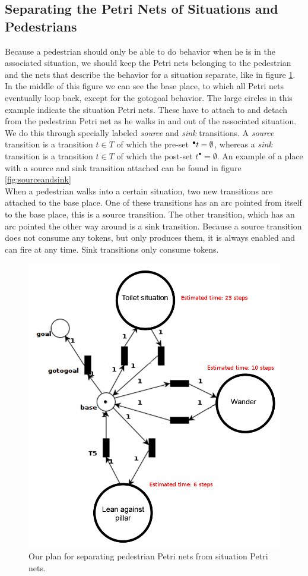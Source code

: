 \documentclass[11pt, a4paper]{book}
\begin{document}
\subsection{Separating the Petri Nets of Situations and Pedestrians}
Because a pedestrian should only be able to do behavior when he is in the associated situation, we should keep the Petri nets belonging to the pedestrian and the nets that describe the behavior for a situation separate, like in figure \ref{petrinetexample}. In the middle of this figure we can see the base place, to which all Petri nets eventually loop back, except for the gotogoal behavior. The large circles in this example indicate the situation Petri nets. These have to attach to and detach from the pedestrian Petri net as he walks in and out of the associated situation. We do this through specially labeled \emph{source} and \emph{sink} transitions.
A \emph{source} transition is a transition $t \in T$ of which the pre-set $\prescript{\bullet}{}{t} = \emptyset$, whereas a \emph{sink} transition is a transition $t \in T$ of which the post-set $t^{\bullet} = \emptyset$. An example of a place with a source and sink transition attached can be found in figure \ref{fig:sourceandsink}\\
 When a pedestrian walks into a certain situation, two new transitions are attached to the base place. One of these transitions has an arc pointed from itself to the base place, this is a source transition. The other transition, which has an arc pointed the other way around is a sink transition. Because a source transition does not consume any tokens, but only produces them, it is always enabled and can fire at any time. Sink transitions only consume tokens.\\
\begin{figure}[h!]
\centering
\includegraphics[width=.6\textwidth]{petrinet_pictures/example_2_copy.png}
\caption{Our plan for separating pedestrian Petri nets from situation Petri nets.}
\label{petrinetexample}
\end{figure}
\end{document}
